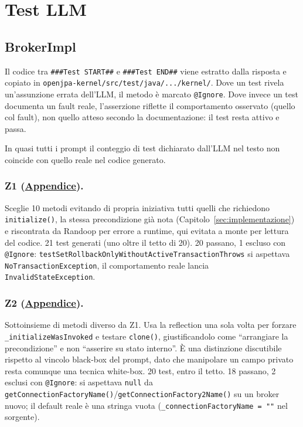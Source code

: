 \section{Test LLM}
\label{sec:llm}

\subsection{BrokerImpl}

Il codice tra \texttt{\#\#\#Test START\#\#} e \texttt{\#\#\#Test END\#\#} viene estratto dalla
risposta e copiato in
\texttt{openjpa-kernel/src/test/java/.../kernel/}. Dove un test rivela un'assunzione errata dell'LLM, il metodo è marcato
\texttt{@Ignore}. Dove invece un test documenta un fault reale,
l'asserzione riflette il comportamento osservato (quello col fault), non quello atteso secondo
la documentazione: il test resta attivo e passa.

In quasi tutti i prompt il conteggio di test dichiarato dall'LLM nel testo non coincide con
quello reale nel codice generato.

\subsubsection{Z1 (\hyperref[prompt:z1]{Appendice}).}
Sceglie 10 metodi evitando di propria iniziativa tutti quelli che richiedono
\texttt{initialize()}, la stessa precondizione già nota (Capitolo~\ref{sec:implementazione}) e
riscontrata da Randoop per errore a runtime, qui evitata a monte per lettura del codice. 21 test
generati (uno oltre il tetto di 20). 20 passano, 1 escluso con \texttt{@Ignore}:
\texttt{testSetRollbackOnlyWithoutActiveTransactionThrows} si aspettava
\texttt{NoTransactionException}, il comportamento reale lancia \texttt{InvalidStateException}.

\subsubsection{Z2 (\hyperref[prompt:z2]{Appendice}).}
Sottoinsieme di metodi diverso da Z1. Usa la reflection una sola volta per forzare
\texttt{\_initializeWasInvoked} e testare \texttt{clone()}, giustificandolo come
``arrangiare la precondizione'' e non ``asserire su stato interno''. È una distinzione discutibile
rispetto al vincolo black-box del prompt, dato che manipolare un campo privato resta comunque una
tecnica white-box. 20 test, entro il tetto. 18 passano, 2 esclusi con \texttt{@Ignore}: si
aspettava \texttt{null} da \texttt{getConnectionFactoryName()}/\texttt{getConnectionFactory2Name()}
su un broker nuovo; il default reale è una stringa vuota (\texttt{\_connectionFactoryName = ""}
nel sorgente).

